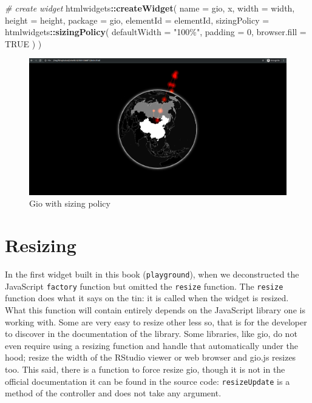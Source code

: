\documentclass[
]{krantz}
\makeatletter
\newenvironment{Shaded}{\begin{snugshade}}{\end{snugshade}}
\newcommand{\CommentTok}[1]{\textcolor[rgb]{0.37,0.37,0.37}{\textit{#1}}}
\newcommand{\DataTypeTok}[1]{\textcolor[rgb]{0.27,0.27,0.27}{#1}}
\newcommand{\DecValTok}[1]{\textcolor[rgb]{0.06,0.06,0.06}{#1}}
\newcommand{\KeywordTok}[1]{\textcolor[rgb]{0.27,0.27,0.27}{\textbf{#1}}}
\newcommand{\NormalTok}[1]{#1}
\newcommand{\OperatorTok}[1]{\textcolor[rgb]{0.43,0.43,0.43}{\textbf{#1}}}
\newcommand{\OtherTok}[1]{\textcolor[rgb]{0.37,0.37,0.37}{#1}}
\newcommand{\StringTok}[1]{\textcolor[rgb]{0.5,0.5,0.5}{#1}}
\newenvironment{kframe}{%
\medskip{}
\setlength{\fboxsep}{.8em}
 \def\at@end@of@kframe{}%
 \ifinner\ifhmode%
  \def\at@end@of@kframe{\end{minipage}}%
  \begin{minipage}{\columnwidth}%
 \fi\fi%
 \def\FrameCommand##1{\hskip\@totalleftmargin \hskip-\fboxsep
 \colorbox{shadecolor}{##1}\hskip-\fboxsep
     \hskip-\linewidth \hskip-\@totalleftmargin \hskip\columnwidth}%
 \MakeFramed {\advance\hsize-\width
   \@totalleftmargin\z@ \linewidth\hsize
   \@setminipage}}%
 {\par\unskip\endMakeFramed%
 \at@end@of@kframe}
\renewenvironment{Shaded}{\begin{kframe}}{\end{kframe}}
\makeatother
\begin{document}
\begin{Shaded}
\begin{Highlighting}[]
\CommentTok{\# create widget}
\NormalTok{htmlwidgets}\OperatorTok{::}\KeywordTok{createWidget}\NormalTok{(}
  \DataTypeTok{name =} \StringTok{\textquotesingle{}gio\textquotesingle{}}\NormalTok{,}
\NormalTok{  x,}
  \DataTypeTok{width =}\NormalTok{ width,}
  \DataTypeTok{height =}\NormalTok{ height,}
  \DataTypeTok{package =} \StringTok{\textquotesingle{}gio\textquotesingle{}}\NormalTok{,}
  \DataTypeTok{elementId =}\NormalTok{ elementId,}
  \DataTypeTok{sizingPolicy =}\NormalTok{ htmlwidgets}\OperatorTok{::}\KeywordTok{sizingPolicy}\NormalTok{(}
    \DataTypeTok{defaultWidth =} \StringTok{"100\%"}\NormalTok{,}
    \DataTypeTok{padding =} \DecValTok{0}\NormalTok{,}
    \DataTypeTok{browser.fill =} \OtherTok{TRUE}
\NormalTok{  )}
\NormalTok{)}
\end{Highlighting}
\end{Shaded}

\begin{figure}
\centering
\includegraphics{images/gio-fit.png}
\caption{Gio with sizing policy}
\end{figure}

\hypertarget{widgets-adv-resizing}{%
\section{Resizing}\label{widgets-adv-resizing}}

In the first widget built in this book (\texttt{playground}), when we deconstructed the JavaScript \texttt{factory} function but omitted the \texttt{resize} function. The \texttt{resize} function does what it says on the tin: it is called when the widget is resized. What this function will contain entirely depends on the JavaScript library one is working with. Some are very easy to resize other less so, that is for the developer to discover in the documentation of the library. Some libraries, like gio, do not even require using a resizing function and handle that automatically under the hood; resize the width of the RStudio viewer or web browser and gio.js resizes too. This said, there is a function to force resize gio, though it is not in the official documentation it can be found in the source code: \texttt{resizeUpdate} is a method of the controller and does not take any argument.
\end{document}
